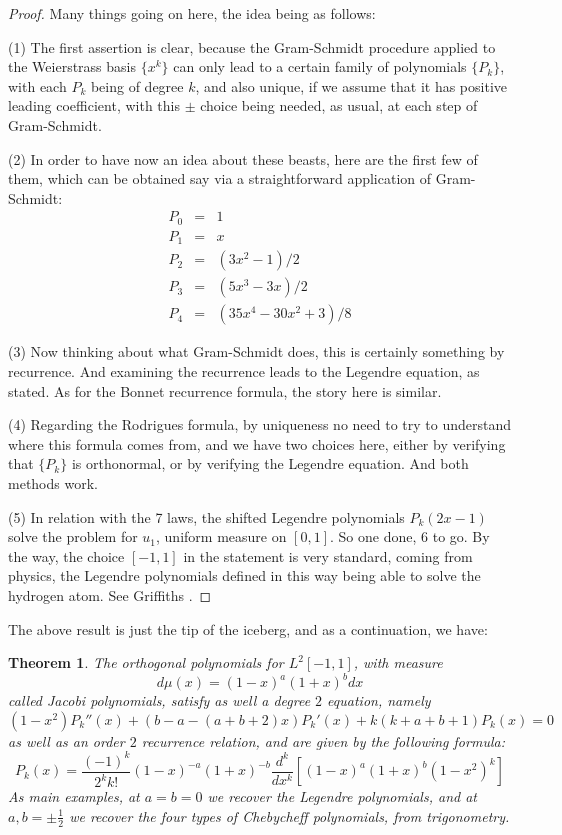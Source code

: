 \documentclass[12pt]{amsbook}
\newtheorem{theorem}{Theorem}[chapter]
\begin{document}
\begin{proof}
Many things going on here, the idea being as follows:

\medskip

(1) The first assertion is clear, because the Gram-Schmidt procedure applied to the Weierstrass basis $\{x^k\}$ can only lead to a certain family of polynomials $\{P_k\}$, with each $P_k$ being of degree $k$, and also unique, if we assume that it has positive leading coefficient, with this $\pm$ choice being needed, as usual, at each step of Gram-Schmidt.

\medskip

(2) In order to have now an idea about these beasts, here are the first few of them, which can be obtained say via a straightforward application of Gram-Schmidt:
\begin{eqnarray*}
P_0&=&1\\
P_1&=&x\\
P_2&=&(3x^2-1)/2\\
P_3&=&(5x^3-3x)/2\\
P_4&=&(35x^4-30x^2+3)/8
\end{eqnarray*}

(3) Now thinking about what Gram-Schmidt does, this is certainly something by recurrence. And examining the recurrence leads to the Legendre equation, as stated. As for the Bonnet recurrence formula, the story here is similar.

\medskip

(4) Regarding the Rodrigues formula, by uniqueness no need to try to understand where this formula comes from, and we have two choices here, either by verifying that $\{P_k\}$ is orthonormal, or by verifying the Legendre equation. And both methods work.

\medskip

(5) In relation with the 7 laws, the shifted Legendre polynomials $P_k(2x-1)$ solve the problem for $u_1$, uniform measure on $[0,1]$. So one done, 6 to go. By the way, the choice $[-1,1]$ in the statement is very standard, coming from physics, the Legendre polynomials defined in this way being able to solve the hydrogen atom. See Griffiths \cite{gri}.
\end{proof}

The above result is just the tip of the iceberg, and as a continuation, we have:


\begin{theorem}
The orthogonal polynomials for $L^2[-1,1]$, with measure
$$d\mu(x)=(1-x)^a(1+x)^bdx$$
called Jacobi polynomials, satisfy as well a degree $2$ equation, namely
$$(1-x^2)P_k''(x)+(b-a-(a+b+2)x)P_k'(x)+k(k+a+b+1)P_k(x)=0$$
as well as an order $2$ recurrence relation, and are given by the following formula:
$$P_k(x)=\frac{(-1)^k}{2^kk!}(1-x)^{-a}(1+x)^{-b}\frac{d^k}{dx^k}\left[(1-x)^a(1+x)^b(1-x^2)^k\right]$$
As main examples, at $a=b=0$ we recover the Legendre polynomials, and at $a,b=\pm\frac{1}{2}$ we recover the four types of Chebycheff polynomials, from trigonometry. 
\end{theorem}
\end{document}
